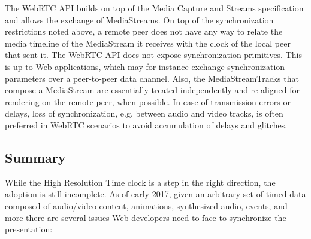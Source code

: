 \documentclass[graybox]{svmult}
\begin{document}
The WebRTC API builds on top of the Media Capture and Streams specification
and allows the exchange of MediaStreams. On top of the synchronization
restrictions noted above, a remote peer does not have any way to relate the
media timeline of the MediaStream it receives with the clock of the local
peer that sent it. The \mbox{WebRTC} API does not expose synchronization primitives.
This is up to Web applications, which may for instance exchange
synchronization parameters over a peer-to-peer data channel. Also, the
MediaStreamTracks that compose a MediaStream are essentially treated
independently and re-aligned for rendering on the remote peer, when possible.
In case of transmission errors or delays, loss of synchronization, e.g.
between audio and video tracks, is often preferred in WebRTC scenarios to
avoid accumulation of delays and glitches.

\subsection{Summary}

While the High Resolution Time clock is a step in the right direction, the
adoption is still incomplete. As of early 2017, given an arbitrary set of
timed data composed of audio/video content, animations, synthesized audio,
events, and more there are several issues Web developers need to face to
synchronize the presentation:
\end{document}
